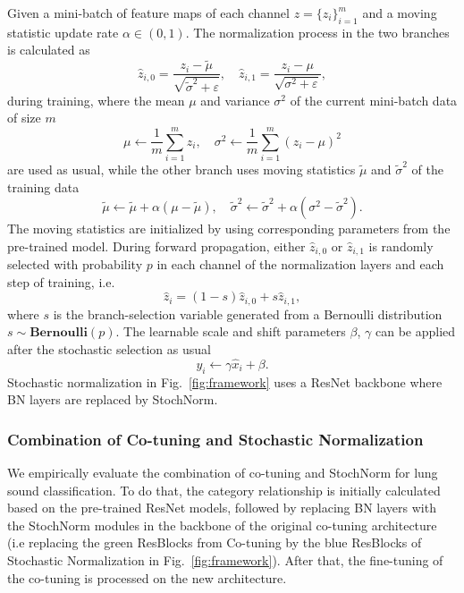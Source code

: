 \documentclass[journal]{IEEEtran}
\begin{document}
Given a mini-batch of feature maps of each channel $z=\{z_i\}^m_{i=1}$ and a moving statistic update rate $\alpha \in (0,1)$. The normalization process in the two branches is calculated as 
\begin{equation}\label{z0z1}
   \hat{z}_{i, 0}=\frac{z_i-\tilde{\mu}}{\sqrt{\tilde{\sigma}^{2}+\varepsilon }}, \quad    \hat{z}_{i, 1}=\frac{z_i-\mu}{\sqrt{\sigma^{2}+\varepsilon }},
\end{equation}
during training, where the mean $\mu$ and variance $\sigma^2$ of the current mini-batch data of size $m$ 
\begin{equation}\label{musigma}
    \mu \leftarrow  \frac{1}{m}\sum_{i=1}^{m}z_i,  \quad  
    \sigma ^{2} \leftarrow \frac{1}{m}\sum_{i=1}^{m}(z_i -\mu)^{2}
\end{equation}
are used as usual, while the other branch uses moving statistics $\tilde{\mu}$ and $\tilde{\sigma}^2$ of the training data 
\begin{equation}\label{movingmusigma}
    \tilde{\mu} \leftarrow \tilde{\mu}+\alpha(\mu-\tilde{\mu}), \quad  
    \tilde{\sigma}^{2} \leftarrow \tilde{\sigma}^{2}+\alpha(\sigma^{2} - \tilde{\sigma}^{2}).
\end{equation}
The moving statistics are initialized by using corresponding parameters from the pre-trained model. During forward propagation, either $\hat{z}_{i, 0}$ or $\hat{z}_{i, 1}$ is randomly selected with probability $p$ in each channel of the normalization layers and each step of training, i.e. 
\begin{equation}\label{xhat}
    \hat{z}_i = (1-s)\hat{z}_{i, 0} + s\hat{z}_{i, 1},
\end{equation}
where $s$ is the branch-selection variable generated from a Bernoulli distribution $s \sim \textbf{Bernoulli}(p)$. The learnable scale and shift parameters $\beta$, $\gamma$ can be applied after the stochastic selection as usual
\begin{equation}\label{yi}
    y_i \leftarrow \gamma \hat{x}_i + \beta.
\end{equation}
Stochastic normalization in Fig.~\ref{fig:framework} uses a ResNet backbone where BN layers are replaced by StochNorm.

\subsubsection{Combination of Co-tuning and Stochastic Normalization}
 We empirically evaluate the combination of co-tuning and StochNorm for lung sound classification. To do that, the category relationship is initially calculated based on the pre-trained ResNet models, followed by replacing BN layers with the StochNorm modules in the backbone of the original co-tuning architecture (i.e replacing the green ResBlocks from Co-tuning by the blue ResBlocks of Stochastic Normalization in Fig.~\ref{fig:framework}). After that, the fine-tuning of the co-tuning is processed on the new architecture.
\end{document}
